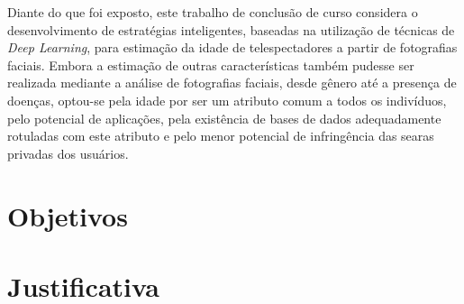 %
%

Diante do que foi exposto, este trabalho de conclusão de curso considera o desenvolvimento de estratégias inteligentes, baseadas na utilização de técnicas de \emph{Deep Learning}, para estimação da idade de telespectadores a partir de fotografias faciais. Embora a estimação de outras características também pudesse ser realizada mediante a análise de fotografias faciais, desde gênero até a presença de doenças, optou-se pela idade por ser um atributo comum a todos os indivíduos, pelo potencial de aplicações, pela existência de bases de dados adequadamente rotuladas com este atributo e pelo menor potencial de infringência das searas privadas dos usuários.

\section{Objetivos}\label{sec:objetivo}


\section{Justificativa}\label{sec:just}


